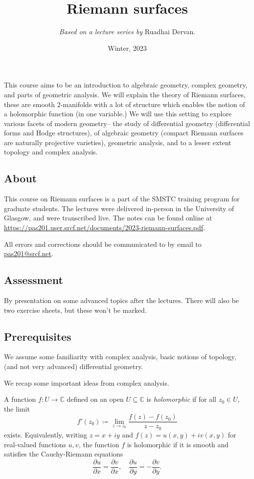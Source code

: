 \title{Riemann surfaces}
\author{\textit{Based on a lecture series by} Ruadhai Dervan.}
\date{Winter, 2023}
\maketitle

 This course aims to be an introduction to
algebraic geometry, complex geometry, and parts of geometric analysis. We will
explain the theory of Riemann surfaces, these are smooth 2-manifolds with a lot
of structure which enables the notion of a holomorphic function (in one
variable.) We will use this setting to explore various facets of modern
geometry-- the study of differential geometry (differential forms and Hodge
structures), of algebraic geometry (compact Riemann surfaces are naturally
projective varieties), geometric analysis, and to a lesser extent topology and
complex analysis.

\subsection{About} This course on Riemann surfaces is a part of the SMSTC
training program for graduate students. The lectures were delivered in-person in
the University of Glasgow, and were transcribed live. The notes can be found
online at
\url{https://pas201.user.srcf.net/documents/2023-riemann-surfaces.pdf}. 

All errors and corrections should be communicated to by email to
\url{pas201@srcf.net}.

\subsection{Assessment} By presentation on some advanced topics after the
lectures. There will also be two exercise sheets, but these won't be marked.

\subsection{Prerequisites} We assume some familiarity with complex analysis,
basic notions of topology, (and not very advanced) differential geometry.

We recap some important ideas from complex analysis.

\begin{definition}
    A function \(f:U\to \mathbb{C}\) defined on an open \(U\subseteq
    \mathbb{C}\)  is \emph{holomorphic} if for all \(z_0\in U\), the limit
    \[f'(z_0)\coloneq \lim_{z\to z_0} \frac{f(z)-f(z_0)}{z-z_0}\]
    exists. Equivalently, writing \(z=x+iy\) and \(f(z)=u(x,y)+iv(x,y)\)  for
    real-valued functions \(u,v\), the function \(f\) is holomorphic if it is
    smooth and satisfies the Cauchy-Riemann equations
    \[
        \frac{\partial u}{\partial x}=\frac{\partial v}{\partial x}, \quad
        \frac{\partial u}{\partial y}=-\frac{\partial v}{\partial y}.
    \]
\end{definition}

